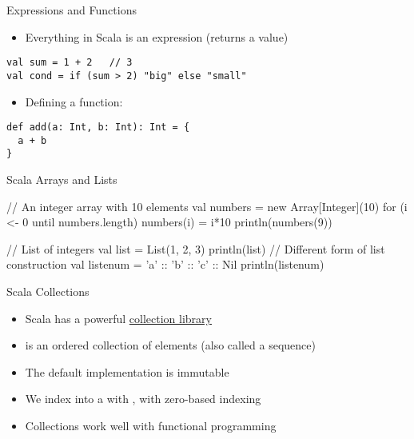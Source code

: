 \begin{frame}[fragile]{Expressions and Functions}
\begin{itemize}
    \item Everything in Scala is an expression (returns a value)
\end{itemize}

\begin{verbatim}
val sum = 1 + 2   // 3
val cond = if (sum > 2) "big" else "small"
\end{verbatim}

\begin{itemize}
    \item Defining a function:
\end{itemize}

\begin{verbatim}
def add(a: Int, b: Int): Int = {
  a + b
}
\end{verbatim}
\end{frame}


\begin{frame}[fragile]{Scala Arrays and Lists}
\begin{chisel}
// An integer array with 10 elements
val numbers = new Array[Integer](10)
for (i <- 0 until numbers.length) {
  numbers(i) = i*10
}
println(numbers(9))


// List of integers
val list = List(1, 2, 3)
println(list)
// Different form of list construction
val listenum = 'a' :: 'b' :: 'c' :: Nil
println(listenum)
\end{chisel}
\end{frame}

\begin{frame}[fragile]{Scala Collections}
\begin{itemize}
\item Scala has a powerful \href{https://docs.scala-lang.org/overviews/collections-2.13/overview.html}{collection library}
\item {} is an ordered collection of elements (also called a sequence)
\item The default implementation is immutable
\item We index into a  with \code{()}, with zero-based indexing
\item Collections work well with functional programming
\end{itemize}
\end{frame}

